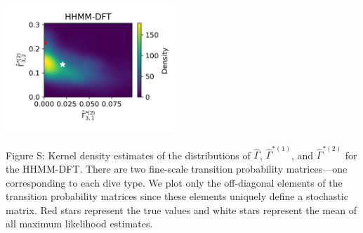 \documentclass{article}
\begin{document}
\begin{center}
        \includegraphics[width=2.5in]{../Plots/hhmm_FV_uncorr_Gamma_density_1_row_2.png}
        \end{center}
        
        \noindent Figure S: Kernel density estimates of the distributions of $\hat \Gamma$, $\hat \Gamma^{*(1)}$, and $\hat \Gamma^{*(2)}$ for the HHMM-DFT. There are two fine-scale transition probability matrices---one corresponding to each dive type. We plot only the off-diagonal elements of the transition probability matrices since these elements uniquely define a stochastic matrix. Red stars represent the true values and white stars represent the mean of all maximum likelihood estimates.
        \addtocounter{fignum}{1}
        
        \newpage
\end{document}
